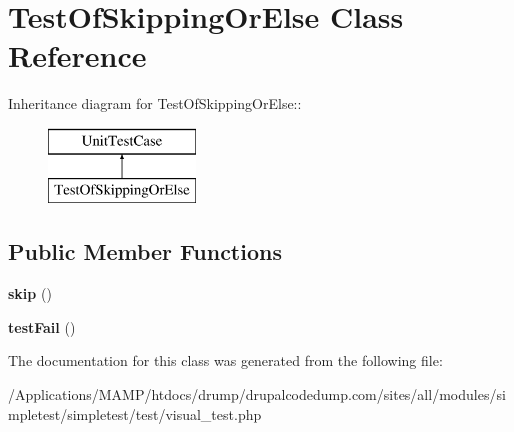 \hypertarget{class_test_of_skipping_or_else}{
\section{TestOfSkippingOrElse Class Reference}
\label{class_test_of_skipping_or_else}
}
Inheritance diagram for TestOfSkippingOrElse::\begin{figure}[H]
\begin{center}
\leavevmode
\includegraphics[height=2cm]{class_test_of_skipping_or_else}
\end{center}
\end{figure}
\subsection*{Public Member Functions}
\begin{DoxyCompactItemize}
\item 
\hypertarget{class_test_of_skipping_or_else_a8e1ec54c98f9b42555a9cd06332e5621}{
{\bfseries skip} ()}
\label{class_test_of_skipping_or_else_a8e1ec54c98f9b42555a9cd06332e5621}

\item 
\hypertarget{class_test_of_skipping_or_else_aadbb74df4c2f97aec651208ae073593a}{
{\bfseries testFail} ()}
\label{class_test_of_skipping_or_else_aadbb74df4c2f97aec651208ae073593a}

\end{DoxyCompactItemize}


The documentation for this class was generated from the following file:\begin{DoxyCompactItemize}
\item 
/Applications/MAMP/htdocs/drump/drupalcodedump.com/sites/all/modules/simpletest/simpletest/test/visual\_\-test.php\end{DoxyCompactItemize}
